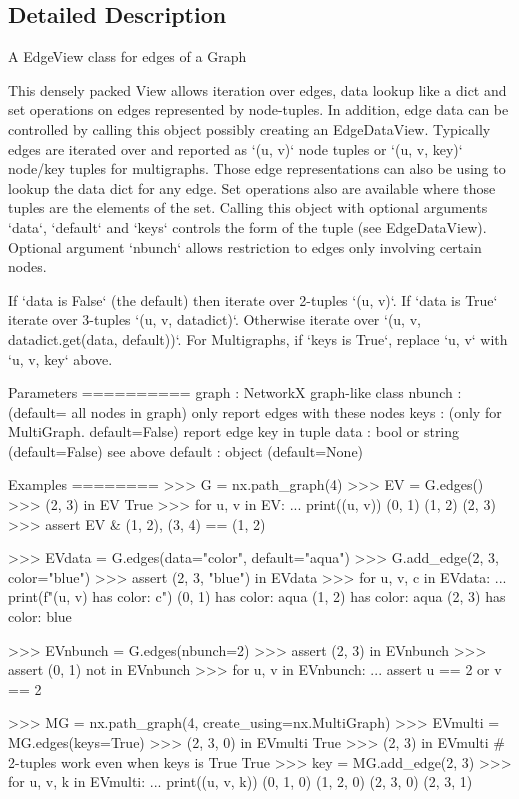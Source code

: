 \subsection{Detailed Description}
\begin{DoxyVerb}A EdgeView class for edges of a Graph

This densely packed View allows iteration over edges, data lookup
like a dict and set operations on edges represented by node-tuples.
In addition, edge data can be controlled by calling this object
possibly creating an EdgeDataView. Typically edges are iterated over
and reported as `(u, v)` node tuples or `(u, v, key)` node/key tuples
for multigraphs. Those edge representations can also be using to
lookup the data dict for any edge. Set operations also are available
where those tuples are the elements of the set.
Calling this object with optional arguments `data`, `default` and `keys`
controls the form of the tuple (see EdgeDataView). Optional argument
`nbunch` allows restriction to edges only involving certain nodes.

If `data is False` (the default) then iterate over 2-tuples `(u, v)`.
If `data is True` iterate over 3-tuples `(u, v, datadict)`.
Otherwise iterate over `(u, v, datadict.get(data, default))`.
For Multigraphs, if `keys is True`, replace `u, v` with `u, v, key` above.

Parameters
==========
graph : NetworkX graph-like class
nbunch : (default= all nodes in graph) only report edges with these nodes
keys : (only for MultiGraph. default=False) report edge key in tuple
data : bool or string (default=False) see above
default : object (default=None)

Examples
========
>>> G = nx.path_graph(4)
>>> EV = G.edges()
>>> (2, 3) in EV
True
>>> for u, v in EV:
...     print((u, v))
(0, 1)
(1, 2)
(2, 3)
>>> assert EV & {(1, 2), (3, 4)} == {(1, 2)}

>>> EVdata = G.edges(data="color", default="aqua")
>>> G.add_edge(2, 3, color="blue")
>>> assert (2, 3, "blue") in EVdata
>>> for u, v, c in EVdata:
...     print(f"({u}, {v}) has color: {c}")
(0, 1) has color: aqua
(1, 2) has color: aqua
(2, 3) has color: blue

>>> EVnbunch = G.edges(nbunch=2)
>>> assert (2, 3) in EVnbunch
>>> assert (0, 1) not in EVnbunch
>>> for u, v in EVnbunch:
...     assert u == 2 or v == 2

>>> MG = nx.path_graph(4, create_using=nx.MultiGraph)
>>> EVmulti = MG.edges(keys=True)
>>> (2, 3, 0) in EVmulti
True
>>> (2, 3) in EVmulti  # 2-tuples work even when keys is True
True
>>> key = MG.add_edge(2, 3)
>>> for u, v, k in EVmulti:
...     print((u, v, k))
(0, 1, 0)
(1, 2, 0)
(2, 3, 0)
(2, 3, 1)
\end{DoxyVerb}
 

